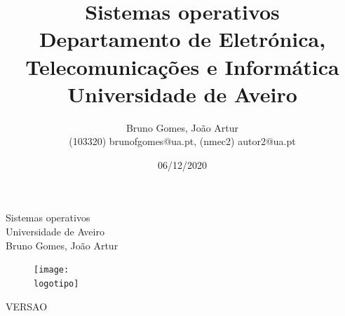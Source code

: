 \documentclass{report}
\begin{document}
%
\def\titulo{Sistemas operativos}
\def\data{06/12/2020}
\def\autores{Bruno Gomes, João Artur}
\def\autorescontactos{(103320) brunofgomes@ua.pt, (nmec2) autor2@ua.pt}
\def\versao{VERSAO}
\def\departamento{Departamento de Eletrónica, Telecomunicações e Informática}
\def\empresa{Universidade de Aveiro}
\def\logotipo{ua.pdf}
%
%
\renewcommand{\contentsname}{Índice}
\begin{titlepage}

\begin{center}
%
\vspace*{50mm}
%
{\Huge \titulo}\\ 
%
\vspace{10mm}
%
{\Large \empresa}\\
%
\vspace{10mm}
%
{\LARGE \autores}\\ 
%
\vspace{30mm}
%
\begin{figure}[h]
\center
\texttt{[image: \\logotipo]}
\end{figure}
%
\vspace{30mm}
\end{center}
%
\begin{flushright}
\versao
\end{flushright}
\end{titlepage}

\title{%
{\Huge\textbf{\titulo}}\\
{\Large \departamento\\ \empresa}
}
%
\author{%
    \autores \\
    \autorescontactos
}
%
\date{\data}
%
\maketitle

\end{document}
